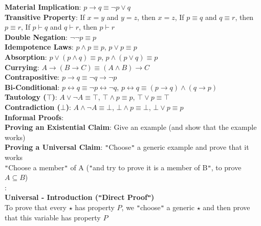 \documentclass{article}
\begin{document}
	\indent{}\textbf{Material Implication}: $p \rightarrow q \equiv \neg p \lor q$ \\
	\indent{}\textbf{Transitive Property}: If $x = y$ and $y = z$, then $x = z$, If $p \equiv q$ and $q \equiv r$, then $p \equiv r$, If $p \vdash q$ and $q \vdash r$, then $p \vdash r$ \\
	\indent{}\textbf{Double Negation}: $\neg \neg p \equiv p$ \\
	\indent{}\textbf{Idempotence Laws}: $p \land p \equiv p$, $p \lor p \equiv p$ \\
	\indent{}\textbf{Absorption}: $p \lor (p \land q) \equiv p$, $p \land (p \lor q) \equiv p$ \\
	\indent{}\textbf{Currying}: $A \rightarrow (B \rightarrow C) \equiv (A \land B) \rightarrow C$ \\
	\indent{}\textbf{Contrapositive}: $p \rightarrow q \equiv \neg q \rightarrow \neg p$ \\
	\indent{}\textbf{Bi-Conditional}: $p \leftrightarrow q \equiv \neg p \leftrightarrow \neg q$, $p \leftrightarrow q \equiv (p \rightarrow q) \land (q \rightarrow p)$ \\
	\indent{}\textbf{Tautology ($\top$)}: $A \lor \neg A \equiv \top$, $\top \land p \equiv p$, $\top \lor p \equiv \top$ \\
	\indent{}\textbf{Contradiction ($\bot$)}: $A \land \neg A \equiv \bot$, $\bot \land p \equiv \bot$, $\bot \lor p \equiv p$ \\
\textbf{Informal Proofs}: \\
	\indent{}\textbf{Proving an Existential Claim}: Give an example (and show that the example works) \\
	\indent{}\textbf{Proving a Universal Claim}: \verb|"|Choose\verb|"| a generic example and prove that it works \\
	\indent{\hspace{\parindent}}\verb|"|Choose a member\verb|"| of A (\verb|"|and try to prove it is a member of B\verb|"|, to prove $A \subseteq B$) \\
	: \\
		\indent{\hspace{\parindent}}\textbf{Universal - Introduction (\texttt{"}Direct Proof\texttt{"})} \\
			\indent{\hspace{\parindent}\hspace{\parindent}}To prove that every $\star$ has property $P$, we \verb|"|choose\verb|"| a generic $\star$ and then prove that this variable has property $P$ \\
\end{document}
